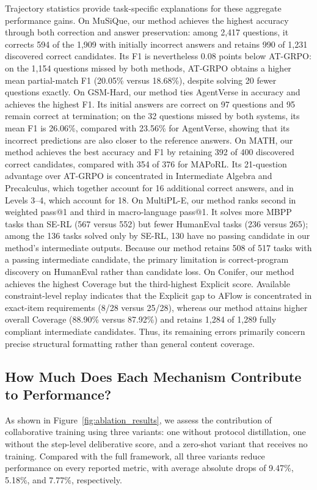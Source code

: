\documentclass{article} %
\begin{document}
Trajectory statistics provide task-specific explanations for these aggregate performance gains. On MuSiQue, our method achieves the highest accuracy through both correction and answer preservation: among 2,417 questions, it corrects 594 of the 1,909 with initially incorrect answers and retains 990 of 1,231 discovered correct candidates. Its F1 is nevertheless 0.08 points below AT-GRPO: on the 1,154 questions missed by both methods, AT-GRPO obtains a higher mean partial-match F1 (20.05\% versus 18.68\%), despite solving 20 fewer questions exactly. On GSM-Hard, our method ties AgentVerse in accuracy and achieves the highest F1. Its initial answers are correct on 97 questions and 95 remain correct at termination; on the 32 questions missed by both systems, its mean F1 is 26.06\%, compared with 23.56\% for AgentVerse, showing that its incorrect predictions are also closer to the reference answers. On MATH, our method achieves the best accuracy and F1 by retaining 392 of 400 discovered correct candidates, compared with 354 of 376 for MAPoRL. Its 21-question advantage over AT-GRPO is concentrated in Intermediate Algebra and Precalculus, which together account for 16 additional correct answers, and in Levels 3--4, which account for 18. On MultiPL-E, our method ranks second in weighted pass@1 and third in macro-language pass@1. It solves more MBPP tasks than SE-RL (567 versus 552) but fewer HumanEval tasks (236 versus 265); among the 136 tasks solved only by SE-RL, 130 have no passing candidate in our method's intermediate outputs. Because our method retains 508 of 517 tasks with a passing intermediate candidate, the primary limitation is correct-program discovery on HumanEval rather than candidate loss. On Conifer, our method achieves the highest Coverage but the third-highest Explicit score. Available constraint-level replay indicates that the Explicit gap to AFlow is concentrated in exact-item requirements (8/28 versus 25/28), whereas our method attains higher overall Coverage (88.90\% versus 87.92\%) and retains 1,284 of 1,289 fully compliant intermediate candidates. Thus, its remaining errors primarily concern precise structural formatting rather than general content coverage.



\subsection{How Much Does Each Mechanism Contribute to Performance?}
\label{sec:ablation}


As shown in Figure~\ref{fig:ablation_results}, we assess the contribution of collaborative training using three variants: one without protocol distillation, one without the step-level deliberative score, and a zero-shot variant that receives no training. Compared with the full framework, all three variants reduce performance on every reported metric, with average absolute drops of 9.47\%, 5.18\%, and 7.77\%, respectively.
\end{document}
